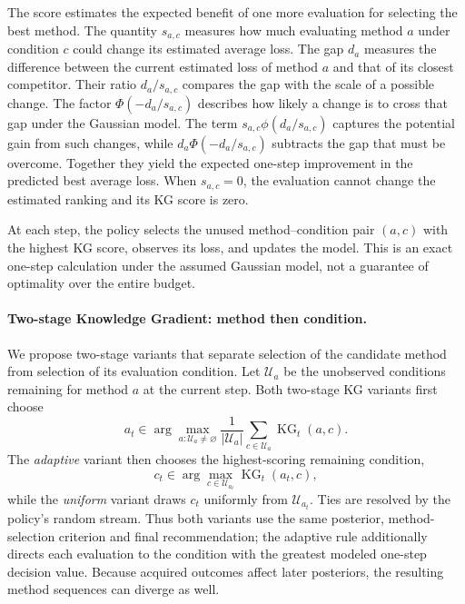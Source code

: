 \documentclass[10pt,a4paper]{article}
\begin{document}
The score estimates the expected benefit of one more evaluation for selecting the best method. The quantity $s_{a,c}$ measures how much evaluating method $a$ under condition $c$ could change its estimated average loss. The gap $d_a$ measures the difference between the current estimated loss of method $a$ and that of its closest competitor. Their ratio $d_a/s_{a,c}$ compares the gap with the scale of a possible change. The factor $\Phi(-d_a/s_{a,c})$ describes how likely a change is to cross that gap under the Gaussian model. The term $s_{a,c}\phi(d_a/s_{a,c})$ captures the potential gain from such changes, while $d_a\Phi(-d_a/s_{a,c})$ subtracts the gap that must be overcome. Together they yield the expected one-step improvement in the predicted best average loss. When $s_{a,c}=0$, the evaluation cannot change the estimated ranking and its KG score is zero.

At each step, the policy selects the unused method--condition pair $(a,c)$ with the highest KG score, observes its loss, and updates the model. This is an exact one-step calculation under the assumed Gaussian model, not a guarantee of optimality over the entire budget.

\paragraph{Two-stage Knowledge Gradient: method then condition.}
We propose two-stage variants that separate selection of the candidate method from selection of its evaluation condition. Let $\mathcal U_a$ be the unobserved conditions remaining for method $a$ at the current step. Both two-stage KG variants first choose
\begin{equation}
a_t\in\arg\max_{a:\mathcal U_a\ne\varnothing}
  \frac{1}{|\mathcal U_a|}
  \sum_{c\in\mathcal U_a}\operatorname{KG}_t(a,c).
\label{eq:two-stage-arm}
\end{equation}
The \emph{adaptive} variant then chooses the highest-scoring remaining condition,
\begin{equation}
c_t\in\arg\max_{c\in\mathcal U_{a_t}}\operatorname{KG}_t(a_t,c),
\label{eq:two-stage-condition}
\end{equation}
while the \emph{uniform} variant draws $c_t$ uniformly from $\mathcal U_{a_t}$. Ties are resolved by the policy's random stream. Thus both variants use the same posterior, method-selection criterion and final recommendation; the adaptive rule additionally directs each evaluation to the condition with the greatest modeled one-step decision value. Because acquired outcomes affect later posteriors, the resulting method sequences can diverge as well.
\end{document}
